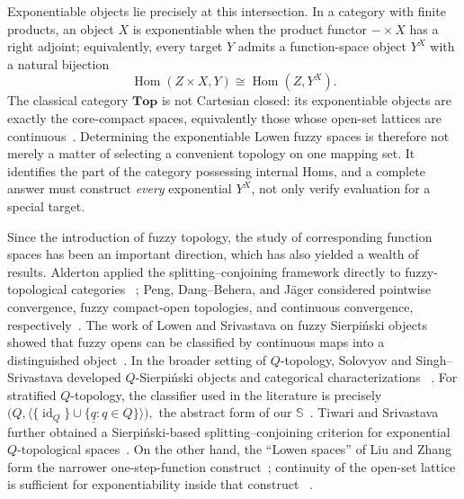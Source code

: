 \documentclass[11pt,a4paper]{article}
\numberwithin{equation}{section}
\theoremstyle{definition}
\theoremstyle{remark}
\newcommand{\Sier}{\mathbb S}
\newcommand{\const}[1]{\underline{#1}}
\newcommand{\Hom}{\operatorname{Hom}}
\newcommand{\id}{\operatorname{id}}
\begin{document}
Exponentiable objects lie precisely at this intersection.  In a
category with finite products, an object \(X\) is exponentiable when
the product functor \(-\times X\) has a right adjoint; equivalently,
every target \(Y\) admits a function-space object \(Y^X\) with a
natural bijection
\[
 \Hom(Z\times X,Y)\cong\Hom(Z,Y^X).
\]
The classical category \(\mathbf{Top}\) is not Cartesian closed: its
exponentiable objects are exactly the core-compact spaces, equivalently
those whose open-set lattices are continuous~\cite{EscardoHeckmann-en}.
Determining the exponentiable Lowen fuzzy spaces is therefore not
merely a matter of selecting a convenient topology on one mapping set.
It identifies the part of the category possessing internal Homs, and a
complete answer must construct \emph{every} exponential \(Y^X\), not
only verify evaluation for a special target.

Since the introduction of fuzzy topology, the study of corresponding function spaces has been an important direction, which has also yielded a wealth of results.
Alderton applied the splitting--conjoining framework
directly to fuzzy-topological categories
~\cite{Alderton1989-en}; Peng, Dang--Behera, and J\"ager considered
pointwise convergence, fuzzy compact-open topologies, and continuous
convergence, respectively~\cite{Peng1984-en,DangBehera1996-en,Jager1999-en}.
The work of Lowen and Srivastava on fuzzy Sierpiński objects showed that
fuzzy opens can be classified by continuous maps into a distinguished
object~\cite{Srivastava1984-en,SrivastavaSrivastava1986-en,
LowenSrivastava1988-en,LowenSrivastava1989-en}.  In the broader setting
of \(Q\)-topology, Solovyov and Singh--Srivastava developed
\(Q\)-Sierpiński objects and categorical characterizations
~\cite{Solovyov2008-en,SinghSrivastava2013-en}.  For stratified
\(Q\)-topology, the classifier used in the literature is precisely
$
 \bigl(Q,\langle\{\id_Q\}\cup
 \{\const q:q\in Q\}\rangle\bigr),
$
the abstract form of our \(\Sier\)~\cite{TiwariSrivastava2022-en}.
Tiwari and Srivastava further obtained a Sierpiński-based
splitting--conjoining criterion for exponential \(Q\)-topological
spaces~\cite{TiwariSrivastava2021-en}.  On the other hand, the ``Lowen
spaces'' of Liu and Zhang form the narrower one-step-function
construct~\cite{LiuZhang2000-en}; continuity of the open-set lattice is
sufficient for exponentiability inside that construct
~\cite{LiuZhang2001-en}.  %
\end{document}
